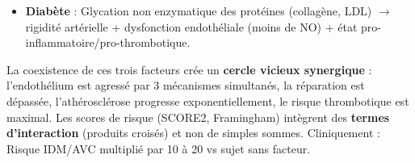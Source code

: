 \documentclass[11pt]{article}
\begin{document}
\begin{corrige}
\begin{enumerate}
\begin{itemize}
        \item \textbf{Diabète} : Glycation non enzymatique des protéines (collagène, LDL) $\to$ rigidité artérielle + dysfonction endothéliale (moins de NO) + état pro-inflammatoire/pro-thrombotique.
    \end{itemize}
    La coexistence de ces trois facteurs crée un \textbf{cercle vicieux synergique} : l'endothélium est agressé par 3 mécanismes simultanés, la réparation est dépassée, l'athérosclérose progresse exponentiellement, le risque thrombotique est maximal. Les scores de risque (SCORE2, Framingham) intègrent des \textbf{termes d'interaction} (produits croisés) et non de simples sommes. Cliniquement : Risque IDM/AVC multiplié par 10 à 20 vs sujet sans facteur.
\end{enumerate}
\end{corrige}
\end{document}
